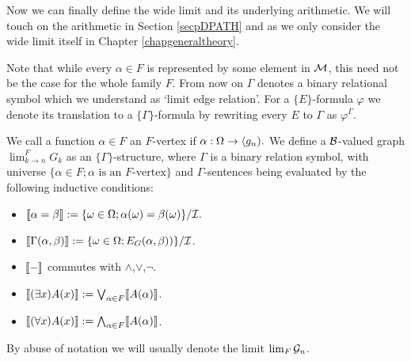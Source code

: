 Now we can finally define the wide limit and its underlying arithmetic. We will touch on the arithmetic in Section \ref{secpDPATH} and as we only consider the wide limit itself in Chapter \ref{chapgeneraltheory}.

Note that while every $\alpha\in F$ is represented by some element in $\mathcal{M}$, this need not be the case for the whole family $F$. From now on $\Gamma$ denotes a binary relational symbol which we understand as `limit edge relation'. For a $\{E\}$-formula $\varphi$ we denote its translation to a $\{\Gamma\}$-formula by rewriting every $E$ to $\Gamma$ as $\varphi^{\Gamma}$.

\begin{defi}
We call a function $\alpha\in F$ an $F$-vertex if ${\alpha:\Omega\to\langle g_n)}.$ We define a $\mathcal{B}$-valued graph $\lim_{k\to n}^{F}G_k$ as an $\{\Gamma\}$-structure, where $\Gamma$ is a binary relation symbol, with universe $\{\alpha\in F; \alpha\text{ is an $F$-vertex}\}$ and $\Gamma$-sentences being evaluated by the following inductive conditions:
\begin{itemize}
\item $\llbracket \alpha=\beta \rrbracket := \{\omega\in\Omega; \alpha(\omega)=\beta(\omega)\}/\mathcal{I}.$
\item $\llbracket \Gamma(\alpha,\beta) \rrbracket := \{\omega\in\Omega; E_G(\alpha,\beta))\}/\mathcal{I}$.
\item $\llbracket-\rrbracket$ commutes with $\land$,$\lor$,$\lnot$.
\item $\llbracket(\exists x)A(x)\rrbracket:=\bigvee_{\alpha\in F}\llbracket A(\alpha)\rrbracket$.
\item $\llbracket(\forall x)A(x)\rrbracket:=\bigwedge_{\alpha\in F}\llbracket A(\alpha)\rrbracket$.
\end{itemize}

By abuse of notation we will usually denote the limit $\lim_{F}\mathcal{G}_n$.
\end{defi}

